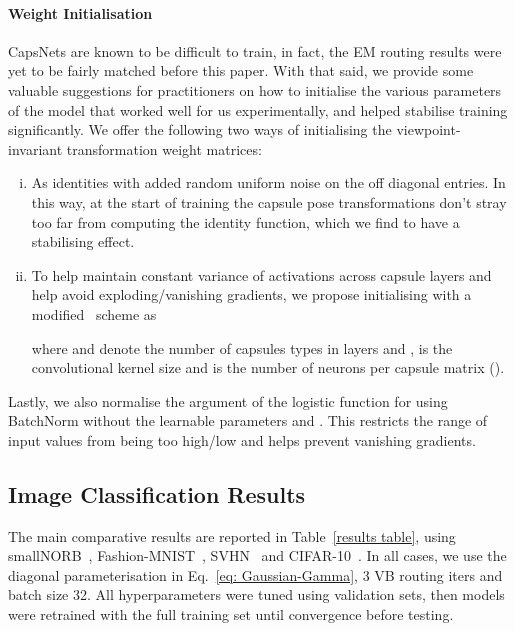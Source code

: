 \documentclass[letterpaper]{article} \usepackage{aaai20}  \usepackage{times}  \usepackage{helvet} \usepackage{courier}  \usepackage[hyphens]{url}  \usepackage{graphicx} \urlstyle{rm} \def\UrlFont{\rm}  \usepackage{graphicx}  \frenchspacing  \setlength{\pdfpagewidth}{8.5in}  \setlength{\pdfpageheight}{11in}  \nocopyright
\begin{document}
\paragraph{Weight Initialisation}
CapsNets are known to be difficult to train, in fact, the EM routing results were yet to be fairly matched before this paper. With that said, we provide some valuable suggestions for practitioners on how to initialise the various parameters of the model that worked well for us experimentally, and helped stabilise training significantly. 
We offer the following two ways of initialising the  viewpoint-invariant transformation weight matrices:
\begin{enumerate}[(i)]
  \item As identities  with added random uniform noise  on the off diagonal entries. In this way, at the start of training the capsule pose transformations don't stray too far from computing the identity function, which we find to have a stabilising effect.
  \item To help maintain constant variance of activations across capsule layers and help avoid exploding/vanishing gradients, we propose initialising  with a modified~\cite{glorot2010understanding} scheme as

where  and  denote the number of capsules types in layers  and ,  is the convolutional kernel size and  is the number of neurons per capsule matrix ().
\end{enumerate}
Lastly, we also normalise the argument of the logistic function for  using {\selectfont BatchNorm} without the learnable parameters  and . This restricts the range of input values from being too high/low and helps prevent vanishing gradients. 
\subsection{Image Classification Results}
\label{results_section}
The main comparative results are reported in Table~\ref{results table}, using smallNORB~\cite{lecun2004learning}, Fashion-MNIST~\cite{xiao2017fashion}, SVHN~\cite{netzer2011reading} and CIFAR-10~\cite{krizhevsky2009learning}. In all cases, we use the diagonal parameterisation in Eq.~\eqref{eq: Gaussian-Gamma}, 3 VB routing iters and batch size 32. All hyperparameters were tuned using validation sets, then models were retrained with the full training set until convergence before testing.
\end{document}
